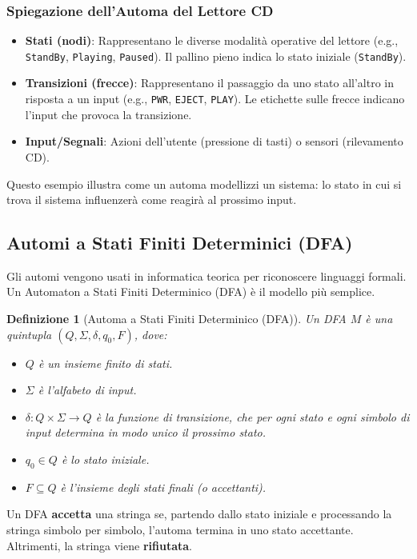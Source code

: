 \documentclass[a4paper, 11pt]{book} %
\newtheorem{definition}[theorem]{Definizione}
\theoremstyle{definition}
\begin{document}
\subsubsection{Spiegazione dell'Automa del Lettore CD}
\begin{itemize}
    \item \textbf{Stati (nodi)}: Rappresentano le diverse modalità operative del lettore (e.g., \texttt{StandBy}, \texttt{Playing}, \texttt{Paused}). Il pallino pieno indica lo stato iniziale (\texttt{StandBy}).
    \item \textbf{Transizioni (frecce)}: Rappresentano il passaggio da uno stato all'altro in risposta a un input (e.g., \texttt{PWR}, \texttt{EJECT}, \texttt{PLAY}). Le etichette sulle frecce indicano l'input che provoca la transizione.
    \item \textbf{Input/Segnali}: Azioni dell'utente (pressione di tasti) o sensori (rilevamento CD).
\end{itemize}
Questo esempio illustra come un automa modellizzi un sistema: lo stato in cui si trova il sistema influenzerà come reagirà al prossimo input.

\subsection{Automi a Stati Finiti Determinici (DFA)}
Gli automi vengono usati in informatica teorica per riconoscere linguaggi formali. Un Automaton a Stati Finiti Determinico (DFA) è il modello più semplice.

\begin{definition}[Automa a Stati Finiti Determinico (DFA)]
Un DFA $M$ è una quintupla $(Q, \Sigma, \delta, q_0, F)$, dove:
\begin{itemize}
    \item $Q$ è un insieme finito di stati.
    \item $\Sigma$ è l'alfabeto di input.
    \item $\delta: Q \times \Sigma \to Q$ è la funzione di transizione, che per ogni stato e ogni simbolo di input determina in modo unico il prossimo stato.
    \item $q_0 \in Q$ è lo stato iniziale.
    \item $F \subseteq Q$ è l'insieme degli stati finali (o accettanti).
\end{itemize}
\end{definition}

Un DFA \textbf{accetta} una stringa se, partendo dallo stato iniziale e processando la stringa simbolo per simbolo, l'automa termina in uno stato accettante. Altrimenti, la stringa viene \textbf{rifiutata}.
\end{document}
